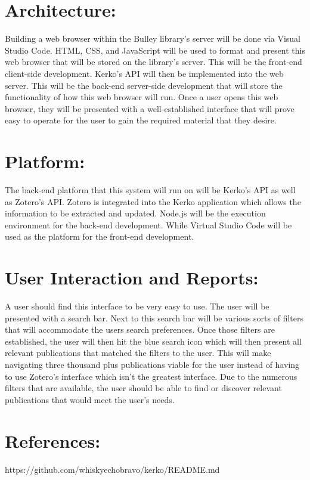 \documentclass[12pt]{article}
\begin{document}
\section{Architecture:}

Building a web browser within the Bulley library’s server will be done via Visual Studio Code.  HTML, CSS, and JavaScript will be used to format and present this web browser that will be stored on the library’s server.  This will be the front-end client-side development.  Kerko’s API will then be implemented into the web server.  This will be the back-end server-side development that will store the functionality of how this web browser will run.  Once a user opens this web browser, they will be presented with a well-established interface that will prove easy to operate for the user to gain the required material that they desire.   

\section{Platform:}

The back-end platform that this system will run on will be Kerko’s API as well as Zotero’s API.  Zotero is integrated into the Kerko application which allows the information to be extracted and updated.  Node.js will be the execution environment for the back-end development.  While Virtual Studio Code will be used as the platform for the front-end development. 

\section{User Interaction and Reports:}

A user should find this interface to be very easy to use.  The user will be presented with a search bar.  Next to this search bar will be various sorts of filters that will accommodate the users search preferences.  Once those filters are established, the user will then hit the blue search icon which will then present all relevant publications that matched the filters to the user.  This will make navigating three thousand plus publications viable for the user instead of having to use Zotero’s interface which isn’t the greatest interface.  Due to the numerous filters that are available, the user should be able to find or discover relevant publications that would meet the user’s needs.   

\section{References:}

https://github.com/whiskyechobravo/kerko/README.md
\end{document}

